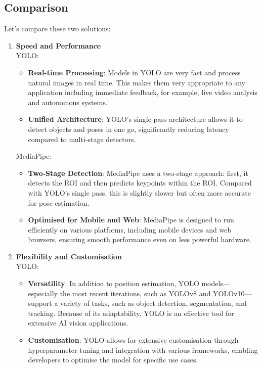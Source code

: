     \subsection{Comparison}
        Let's compare these two solutions:
        \begin{enumerate}
            \item \textbf{Speed and Performance}\\
            YOLO:
            \begin{itemize}
                \item \textbf{Real-time Processing}: Models in YOLO are very fast and process natural images in real time. This makes them very appropriate to any application including immediate feedback, for example, live video analysis and autonomous systems.
                \item \textbf{Unified Architecture}: YOLO’s single-pass architecture allows it to detect objects and poses in one go, significantly reducing latency compared to multi-stage detectors.
            \end{itemize}
            MediaPipe:
            \begin{itemize}
                \item \textbf{Two-Stage Detection}: MediaPipe uses a two-stage approach: first, it detects the ROI and then predicts keypoints within the ROI. Compared with YOLO's single pass, this is slightly slower but often more accurate for pose estimation.
                \item \textbf{Optimised for Mobile and Web}: MediaPipe is designed to run efficiently on various platforms, including mobile devices and web browsers, ensuring smooth performance even on less powerful hardware.
            \end{itemize}
            \item \textbf{Flexibility and Customisation}\\
            YOLO:
            \begin{itemize}
                \item \textbf{Versatility}: In addition to position estimation, YOLO models—especially the most recent iterations, such as YOLOv8 and YOLOv10—support a variety of tasks, such as object detection, segmentation, and tracking. Because of its adaptability, YOLO is an effective tool for extensive AI vision applications.
                \item \textbf{Customisation}: YOLO allows for extensive customisation through hyperparameter tuning and integration with various frameworks, enabling developers to optimise the model for specific use cases.

\end{itemize}
\end{enumerate}
